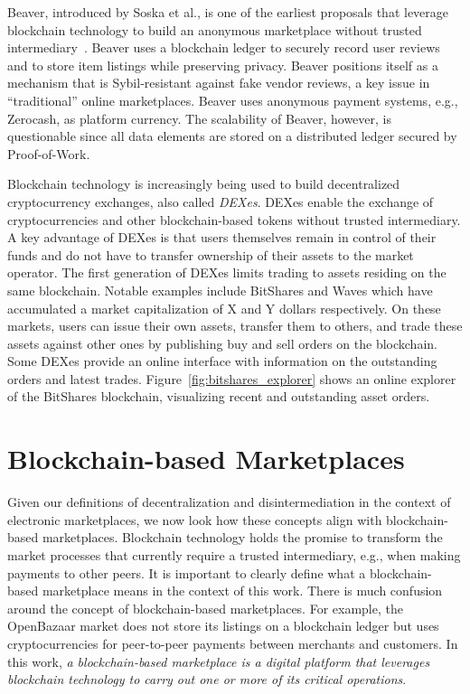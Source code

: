 Beaver, introduced by Soska et al., is one of the earliest proposals that leverage blockchain technology to build an anonymous marketplace without trusted intermediary~\cite{soska2016beaver}.
Beaver uses a blockchain ledger to securely record user reviews and to store item listings while preserving privacy.
Beaver positions itself as a mechanism that is Sybil-resistant against fake vendor reviews, a key issue in \enquote{traditional} online marketplaces.
Beaver uses anonymous payment systems, e.g., Zerocash, as platform currency.
The scalability of Beaver, however, is questionable since all data elements are stored on a distributed ledger secured by Proof-of-Work.

Blockchain technology is increasingly being used to build decentralized cryptocurrency exchanges, also called \emph{DEXes}.
DEXes enable the exchange of cryptocurrencies and other blockchain-based tokens without trusted intermediary.
A key advantage of DEXes is that users themselves remain in control of their funds and do not have to transfer ownership of their assets to the market operator.
The first generation of DEXes limits trading to assets residing on the same blockchain.
Notable examples include BitShares and Waves which have accumulated a market capitalization of X and Y dollars respectively.
On these markets, users can issue their own assets, transfer them to others, and trade these assets against other ones by publishing buy and sell orders on the blockchain.
Some DEXes provide an online interface with information on the outstanding orders and latest trades.
Figure~\ref{fig:bitshares_explorer} shows an online explorer of the BitShares blockchain, visualizing recent and outstanding asset orders.

\section{Blockchain-based Marketplaces}
Given our definitions of decentralization and disintermediation in the context of electronic marketplaces, we now look how these concepts align with blockchain-based marketplaces.
Blockchain technology holds the promise to transform the market processes that currently require a trusted intermediary, e.g., when making payments to other peers.
It is important to clearly define what a blockchain-based marketplace means in the context of this work.
There is much confusion around the concept of blockchain-based marketplaces.
For example, the OpenBazaar market does not store its listings on a blockchain ledger but uses cryptocurrencies for peer-to-peer payments between merchants and customers.
In this work, \emph{a blockchain-based marketplace is a digital platform that leverages blockchain technology to carry out one or more of its critical operations}.

